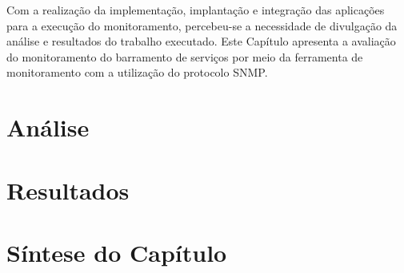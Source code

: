 \label{avaliacao_monitoramento_servicos}

Com a realização da implementação, implantação e integração das aplicações para a execução do monitoramento, percebeu-se a necessidade de divulgação da análise e resultados do trabalho executado. Este Capítulo apresenta a avaliação do monitoramento do barramento de serviços por meio da ferramenta de monitoramento com a utilização do protocolo \acrshort{SNMP}.


\section{Análise}
\label{analise}


\section{Resultados}
\label{resultados}


\section{Síntese do Capítulo}
\label{sintese5}